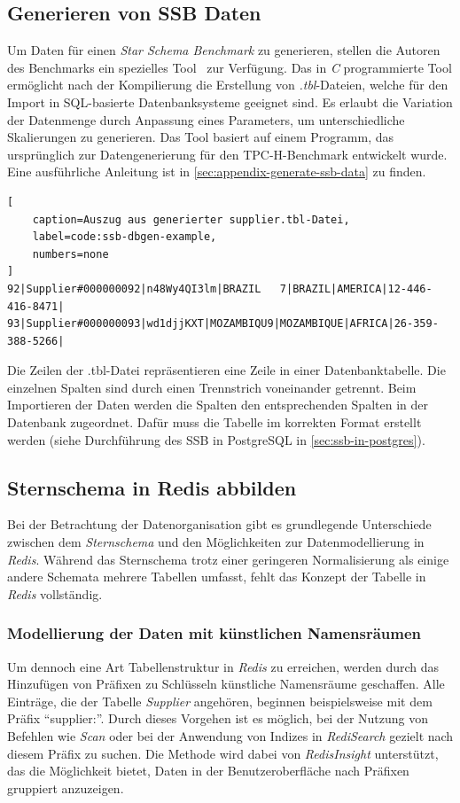 \subsection{Generieren von SSB Daten}
Um Daten für einen \emph{Star Schema Benchmark} zu generieren, stellen die Autoren des Benchmarks ein spezielles Tool~\cite{phillips_electrumssb-dbgen_2023} zur Verfügung.
Das in \emph{C} programmierte Tool ermöglicht nach der Kompilierung die Erstellung von \emph{.tbl}-Dateien, welche für den Import in SQL-basierte Datenbanksysteme geeignet sind.
Es erlaubt die Variation der Datenmenge durch Anpassung eines Parameters, um unterschiedliche Skalierungen zu generieren.
Das Tool basiert auf einem Programm, das ursprünglich zur Datengenerierung für den TPC-H-Benchmark entwickelt wurde. Eine ausführliche Anleitung ist in \cref{sec:appendix-generate-ssb-data} zu finden.
\begin{lstlisting}[
    caption=Auszug aus generierter supplier.tbl-Datei,
    label=code:ssb-dbgen-example,
    numbers=none
]
92|Supplier#000000092|n48Wy4QI3lm|BRAZIL   7|BRAZIL|AMERICA|12-446-416-8471|
93|Supplier#000000093|wd1djjKXT|MOZAMBIQU9|MOZAMBIQUE|AFRICA|26-359-388-5266|
\end{lstlisting}
Die Zeilen der .tbl-Datei repräsentieren eine Zeile in einer Datenbanktabelle. Die einzelnen Spalten sind durch einen Trennstrich voneinander getrennt.
Beim Importieren der Daten werden die Spalten den entsprechenden Spalten in der Datenbank zugeordnet. Dafür muss die Tabelle im korrekten Format erstellt werden (siehe Durchführung des SSB in PostgreSQL in \cref{sec:ssb-in-postgres}).

\subsection{Sternschema in Redis abbilden}
Bei der Betrachtung der Datenorganisation gibt es grundlegende Unterschiede zwischen dem \emph{Sternschema} und den Möglichkeiten zur Datenmodellierung in \emph{Redis}. Während das Sternschema trotz einer geringeren Normalisierung als einige andere Schemata mehrere Tabellen umfasst, fehlt das Konzept der Tabelle in \emph{Redis} vollständig.

\subsubsection{Modellierung der Daten mit künstlichen Namensräumen}
Um dennoch eine Art Tabellenstruktur in \emph{Redis} zu erreichen, werden durch das Hinzufügen von Präfixen zu Schlüsseln künstliche Namensräume geschaffen. Alle Einträge, die der Tabelle \emph{Supplier} angehören, beginnen beispielsweise mit dem Präfix \enquote{supplier:}. Durch dieses Vorgehen ist es möglich, bei der Nutzung von Befehlen wie \emph{Scan} oder bei der Anwendung von Indizes in \emph{RediSearch} gezielt nach diesem Präfix zu suchen. Die Methode wird dabei von \emph{RedisInsight} unterstützt, das die Möglichkeit bietet, Daten in der Benutzeroberfläche nach Präfixen gruppiert anzuzeigen. %

